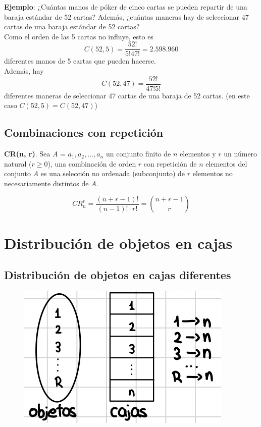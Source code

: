 \documentclass{article}
\begin{document}
\textbf{Ejemplo}: ¿Cuántas manos de póker de cinco cartas se pueden repartir de una baraja estándar de 52 cartas? Además, ¿cuántas maneras hay de seleccionar 47 cartas de una baraja estándar de 52 cartas? \\

Como el orden de las 5 cartas no influye, esto es 
$$C(52, 5) = \frac{52!}{5!47!} = 2.598.960$$
diferentes manos de 5 cartas que pueden hacerse. \\
Además, hay 
$$C(52, 47) = \frac{52!}{47!5!}$$
diferentes maneras de seleccionar 47 cartas de una baraja de 52 cartas. (en este caso $C(52, 5) = C(52, 47)$)

\subsection{Combinaciones con repetición}
\textbf{CR(n, r)}. Sea $A$ = {$a_1, a_2, ..., a_n$} un conjunto finito de $n$ elementos y $r$ un número natural ($r \geq 0$), una combinación de orden $r$ con repetición de $n$ elementos del conjunto $A$ es una selección no ordenada (subconjunto) de $r$ elementos no necesariamente distintos de $A$.

$$CR_n^r = \frac{(n+r-1)!}{(n-1)! \cdot r!} = \binom{n+r-1}{r}$$

\section{Distribución de objetos en cajas}

\subsection{Distribución de objetos en cajas diferentes}

\begin{figure}
    \centering
    \includegraphics[width=\linewidth]{img-t2/img_035_24.png}
\end{figure}
\end{document}
